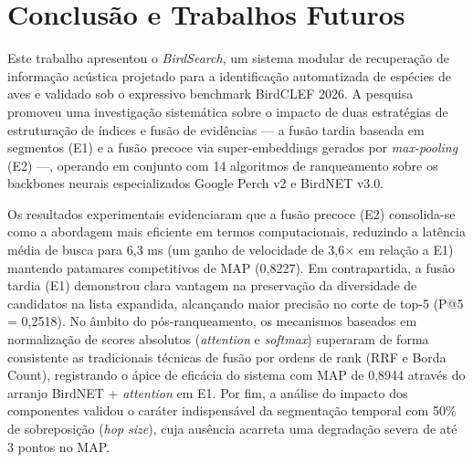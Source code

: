\documentclass[12pt]{article}
\begin{document}

\section{Conclusão e Trabalhos Futuros}
\label{sec:conc}

Este trabalho apresentou o \emph{BirdSearch}, um sistema modular de recuperação de informação acústica projetado para a identificação automatizada de espécies de aves e validado sob o expressivo benchmark BirdCLEF 2026. A pesquisa promoveu uma investigação sistemática sobre o impacto de duas estratégias de estruturação de índices e fusão de evidências — a fusão tardia baseada em segmentos (E1) e a fusão precoce via super-embeddings gerados por \emph{max-pooling} (E2) —, operando em conjunto com 14 algoritmos de ranqueamento sobre os backbones neurais especializados Google Perch v2 e BirdNET v3.0.

Os resultados experimentais evidenciaram que a fusão precoce (E2) consolida-se como a abordagem mais eficiente em termos computacionais, reduzindo a latência média de busca para 6,3 ms (um ganho de velocidade de 3,6$\times$ em relação a E1) mantendo patamares competitivos de MAP (0,8227). Em contrapartida, a fusão tardia (E1) demonstrou clara vantagem na preservação da diversidade de candidatos na lista expandida, alcançando maior precisão no corte de top-5 (P@5 = 0,2518). No âmbito do pós-ranqueamento, os mecanismos baseados em normalização de scores absolutos (\emph{attention} e \emph{softmax}) superaram de forma consistente as tradicionais técnicas de fusão por ordens de rank (RRF e Borda Count), registrando o ápice de eficácia do sistema com MAP de 0,8944 através do arranjo BirdNET + \emph{attention} em E1. Por fim, a análise do impacto dos componentes validou o caráter indispensável da segmentação temporal com 50\% de sobreposição (\emph{hop size}), cuja ausência acarreta uma degradação severa de até 3 pontos no MAP.
\end{document}
